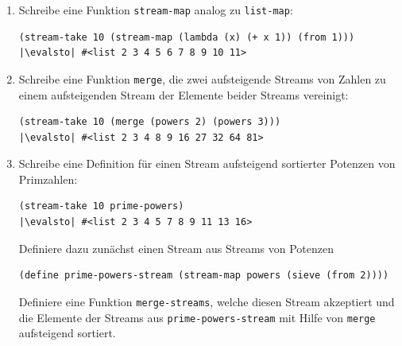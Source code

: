 \begin{aufgabe}
\begin{enumerate}
   \item Schreibe eine Funktion \lstinline{stream-map} analog zu
     \lstinline{list-map}:
\begin{lstlisting}
(stream-take 10 (stream-map (lambda (x) (+ x 1)) (from 1)))
|\evalsto| #<list 2 3 4 5 6 7 8 9 10 11>
\end{lstlisting}
   \item Schreibe eine Funktion \lstinline{merge}, die zwei
     aufsteigende Streams von Zahlen zu einem aufsteigenden Stream
     der Elemente beider Streams vereinigt:
\begin{lstlisting}
(stream-take 10 (merge (powers 2) (powers 3)))
|\evalsto| #<list 2 3 4 8 9 16 27 32 64 81>
\end{lstlisting}
   \item Schreibe eine Definition für einen Stream aufsteigend
     sortierter Potenzen von Primzahlen:
\begin{lstlisting}
(stream-take 10 prime-powers)
|\evalsto| #<list 2 3 4 5 7 8 9 11 13 16>
\end{lstlisting}
     Definiere dazu zunächst einen Stream aus Streams von Potenzen
\begin{lstlisting}
(define prime-powers-stream (stream-map powers (sieve (from 2))))
\end{lstlisting}
     Definiere eine Funktion \lstinline{merge-streams}, welche
     diesen Stream akzeptiert und die Elemente der Streams
     aus \lstinline{prime-powers-stream} mit Hilfe von \lstinline{merge}
     aufsteigend sortiert.
   \end{enumerate}
 \end{aufgabe}

